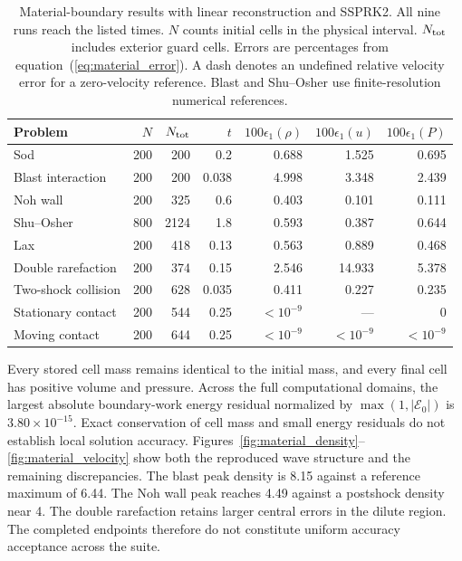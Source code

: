 \documentclass[twocolumn]{aastex63}
\begin{document}
\begin{table}[t]
\centering
\caption{Material-boundary results with linear reconstruction and SSPRK2.
All nine runs reach the listed times. $N$ counts initial cells in the
physical interval. $N_{\rm tot}$ includes exterior guard cells.
Errors are percentages from equation~(\ref{eq:material_error}).
A dash denotes an undefined relative velocity error for a zero-velocity
reference. Blast and Shu--Osher use finite-resolution numerical references.}
\label{tab:material1d}
\begin{tabular}{lrrrrrr}
\toprule
Problem & $N$ & $N_{\rm tot}$ & $t$ & $100\epsilon_1(\rho)$ & $100\epsilon_1(u)$ & $100\epsilon_1(P)$\\
\midrule
Sod &200&200&0.2&0.688&1.525&0.695\\
Blast interaction &200&200&0.038&4.998&3.348&2.439\\
Noh wall &200&325&0.6&0.403&0.101&0.111\\
Shu--Osher &800&2124&1.8&0.593&0.387&0.644\\
Lax &200&418&0.13&0.563&0.889&0.468\\
Double rarefaction &200&374&0.15&2.546&14.933&5.378\\
Two-shock collision &200&628&0.035&0.411&0.227&0.235\\
Stationary contact &200&544&0.25&$<10^{-9}$&---&0\\
Moving contact &200&644&0.25&$<10^{-9}$&$<10^{-9}$&$<10^{-9}$\\
\bottomrule
\end{tabular}
\end{table}

Every stored cell mass remains identical to the initial mass, and every
final cell has positive volume and pressure. Across the full computational
domains, the largest absolute boundary-work energy residual normalized by
$\max(1,|\mathcal E_0|)$ is $3.80\times10^{-15}$. Exact conservation of
cell mass and small energy residuals do not establish local solution
accuracy. Figures~\ref{fig:material_density}--\ref{fig:material_velocity}
show both the reproduced wave structure and the remaining discrepancies.
The blast peak density is 8.15 against a reference maximum of 6.44.
The Noh wall peak reaches 4.49 against a postshock density near 4.
The double rarefaction retains larger central errors in the dilute region.
The completed endpoints therefore do not constitute uniform accuracy
acceptance across the suite.
\end{document}
